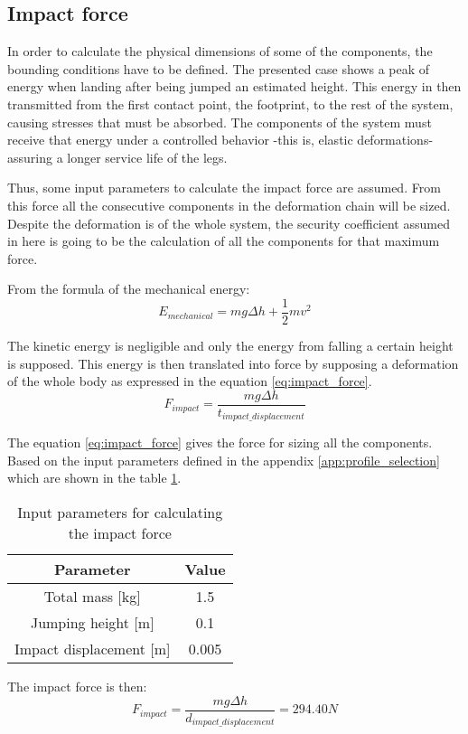 \subsection{Impact force} %
\label{sub:impact_force}
In order to calculate the physical dimensions of some of the components, the bounding conditions have to be defined.
The presented case shows a peak of energy when landing after being jumped an estimated height.
This energy in then transmitted from the first contact point, the footprint, to the rest of the system, causing stresses that must be absorbed.
The components of the system must receive that energy under a controlled behavior -this is, elastic deformations- assuring a longer service life of the legs.

Thus, some input parameters to calculate the impact force are assumed.
From this force all the consecutive components in the deformation chain will be sized.
Despite the deformation is of the whole system, the security coefficient assumed in here is going to be the calculation of all the components for that maximum force.

From the formula of the mechanical energy:
\begin{equation}
  E_{mechanical} = m g \Delta h + \frac{1}{2} m v^{2}
\end{equation}

The kinetic energy is negligible and only the energy from falling a certain height is supposed.
This energy is then translated into force by supposing a deformation of the whole body as expressed in the equation \ref{eq:impact_force}.
\begin{equation}
\label{eq:impact_force}
  F_{impact} = \frac{m g \Delta h}{t_{impact\_displacement}}
\end{equation}

The equation \ref{eq:impact_force} gives the force for sizing all the components.
Based on the input parameters defined in the appendix \ref{app:profile_selection} which are shown in the table \ref{tab:input_parameter_impact_force}.
\begin{table}
\begin{center}
\begin{tabular}{c | c}
  Parameter & Value \\
  \hline
  Total mass [kg] & 1.5 \\
  Jumping height [m] & 0.1 \\
  Impact displacement [m] & 0.005
\end{tabular}
\caption{Input parameters for calculating the impact force}
\label{tab:input_parameter_impact_force}
\end{center}
\end{table}

The impact force is then:
\begin{equation}
  F_{impact} = \frac{m g \Delta h}{d_{impact\_displacement}} = 294.40 N 
\end{equation}
